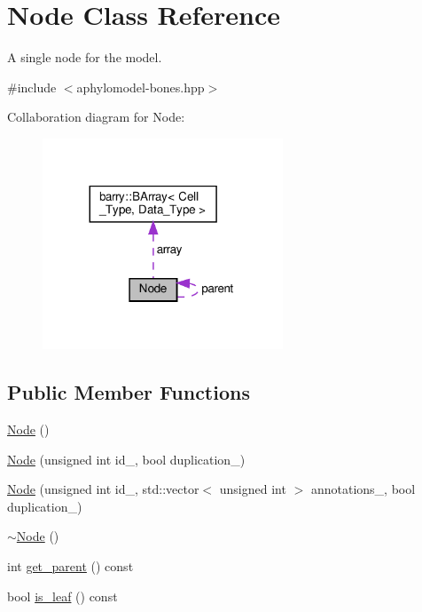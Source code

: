 \hypertarget{class_node}{}\section{Node Class Reference}
\label{class_node}


A single node for the model.  




{\ttfamily \#include $<$aphylomodel-\/bones.\+hpp$>$}



Collaboration diagram for Node\+:\nopagebreak
\begin{figure}[H]
\begin{center}
\leavevmode
\includegraphics[width=203pt]{class_node__coll__graph}
\end{center}
\end{figure}
\subsection*{Public Member Functions}
\begin{DoxyCompactItemize}
\item 
\hyperlink{class_node_ad7a34779cad45d997bfd6d3d8043c75f}{Node} ()
\item 
\hyperlink{class_node_affbe0c59bdcfd5e8068d50b49742cff6}{Node} (unsigned int id\+\_\+, bool duplication\+\_\+)
\item 
\hyperlink{class_node_a05edab5d06fba5a71443399343645553}{Node} (unsigned int id\+\_\+, std\+::vector$<$ unsigned int $>$ annotations\+\_\+, bool duplication\+\_\+)
\item 
\hyperlink{class_node_aa0840c3cb5c7159be6d992adecd2097c}{$\sim$\+Node} ()
\item 
int \hyperlink{class_node_a661cb63a33e950b84c9c093c63d1ab63}{get\+\_\+parent} () const
\item 
bool \hyperlink{class_node_af7cc2d0f435e3bee4388a0e9ab42adb8}{is\+\_\+leaf} () const
\end{DoxyCompactItemize}
